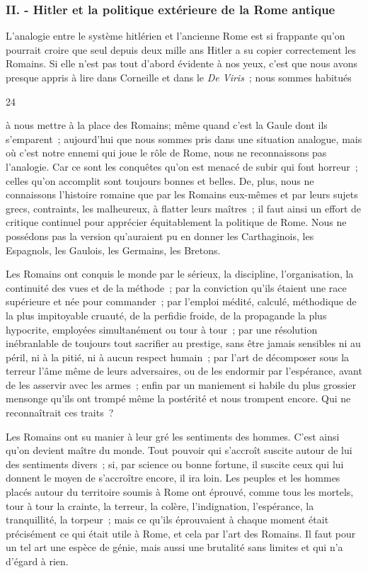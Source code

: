 \documentclass[french,twoside]{book} %
\begin{document}
\subsubsection[II. - Hitler et la politique extérieure de la Rome antique]{II. - Hitler et la politique extérieure de la Rome antique}
\noindent \par
L'analogie entre le système hitlérien et l'ancienne Rome est si frappante qu'on pourrait croire que seul depuis deux mille ans Hitler a su copier correctement les Romains. Si elle n'est pas tout d'abord évidente à nos yeux, c'est que nous avons presque appris à lire dans Corneille et dans le {\itshape De Viris} ; nous sommes habitués\par
24\par
à nous mettre à la place des Romains; même quand c'est la Gaule dont ils s'emparent ; aujourd'hui que nous sommes pris dans une situation analogue, mais où c'est notre ennemi qui joue le rôle de Rome, nous ne reconnaissons pas l'analogie. Car ce sont les conquêtes qu'on est menacé de subir qui font horreur ; celles qu'on accomplit sont toujours bonnes et belles. De, plus, nous ne connaissons l'histoire romaine que par les Romains eux-mêmes et par leurs sujets grecs, contraints, les malheureux, à flatter leurs maîtres ; il faut ainsi un effort de critique continuel pour apprécier équitablement la politique de Rome. Nous ne possédons pas la version qu'auraient pu en donner les Cartha­ginois, les Espagnols, les Gaulois, les Germains, les Bretons.\par
Les Romains ont conquis le monde par le sérieux, la discipline, l'organisa­tion, la continuité des vues et de la méthode ; par la conviction qu'ils étaient une race supérieure et née pour commander ; par l'emploi médité, calculé, méthodique de la plus impitoyable cruauté, de la perfidie froide, de la propagande la plus hypocrite, employées simultanément ou tour à tour ; par une résolution inébranlable de toujours tout sacrifier au prestige, sans être jamais sensibles ni au péril, ni à la pitié, ni à aucun respect humain ; par l'art de décomposer sous la terreur l'âme même de leurs adversaires, ou de les endormir par l'espérance, avant de les asservir avec les armes ; enfin par un maniement si habile du plus grossier mensonge qu'ils ont trompé même la postérité et nous trompent encore. Qui ne reconnaîtrait ces traits ?\par
Les Romains ont su manier à leur gré les sentiments des hommes. C'est ainsi qu'on devient maître du monde. Tout pouvoir qui s'accroît suscite autour de lui des sentiments divers ; si, par science ou bonne fortune, il suscite ceux qui lui donnent le moyen de s'accroître encore, il ira loin. Les peuples et les hommes placés autour du territoire soumis à Rome ont éprouvé, comme tous les mortels, tour à tour la crainte, la terreur, la colère, l'indignation, l'espé­rance, la tranquillité, la torpeur ; mais ce qu'ils éprouvaient à chaque moment était précisément ce qui était utile à Rome, et cela par l'art des Romains. Il faut pour un tel art une espèce de génie, mais aussi une brutalité sans limites et qui n'a d'égard à rien.\par
\end{document}
